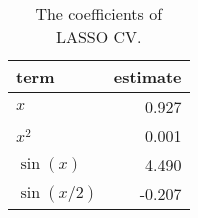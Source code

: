 \begin{table}[t]

\caption{\label{tab:lasso-coefs}The coefficients of \ac{LASSO} CV.}
\centering
\begin{tabular}{lr}
\toprule
term & estimate\\
\midrule
\(x\) & 0.927\\
\(x^2\) & 0.001\\
\(\sin(x)\) & 4.490\\
\(\sin(x/2)\) & -0.207\\
\bottomrule
\end{tabular}
\end{table}